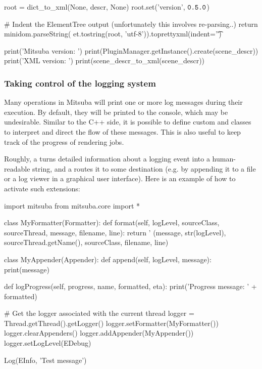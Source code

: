 \begin{python}
    root = dict_to_xml(None, descr, None)
    root.set('version', $\texttt{0.5.0}$)

    # Indent the ElementTree output (unfortunately this involves re-parsing..)
    return minidom.parseString(
        et.tostring(root, 'utf-8')).toprettyxml(indent='\t')

print('Mitsuba version: ')
print(PluginManager.getInstance().create(scene_descr))
print('XML version: ')
print(scene_descr_to_xml(scene_descr))
\end{python}

\subsubsection{Taking control of the logging system}
Many operations in Mitsuba will print one or more log messages
during their execution. By default, they will be printed to the console,
which may be undesirable. Similar to the C++ side, it is possible to define
custom  and  classes to interpret and direct
the flow of these messages. This is also useful to keep track of the progress
of rendering jobs.

Roughly, a  turns detailed
information about a logging event into a human-readable string, and a
 routes it to some destination (e.g. by appending it to
a file or a log viewer in a graphical user interface). Here is an example
of how to activate such extensions:
\begin{python}
import mitsuba
from mitsuba.core import *

class MyFormatter(Formatter):
    def format(self, logLevel, sourceClass, sourceThread, message, filename, line):
        return '%
                (message, str(logLevel), sourceThread.getName(), sourceClass,
                 filename, line)

class MyAppender(Appender):
    def append(self, logLevel, message):
        print(message)

    def logProgress(self, progress, name, formatted, eta):
        print('Progress message: ' + formatted)

# Get the logger associated with the current thread
logger = Thread.getThread().getLogger()
logger.setFormatter(MyFormatter())
logger.clearAppenders()
logger.addAppender(MyAppender())
logger.setLogLevel(EDebug)

Log(EInfo, 'Test message')
\end{python}
